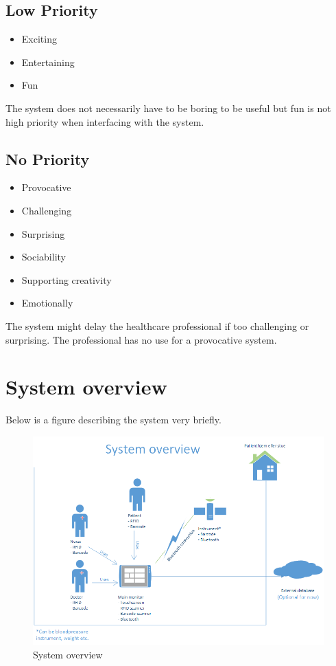 \subsection{Low Priority}
\begin{itemize}
\item Exciting
\item Entertaining
\item Fun
\end{itemize}
The system does not necessarily have to be boring to be useful but fun is not high priority when interfacing with the system.

\subsection{No Priority}
\begin{itemize}
\item Provocative
\item Challenging
\item Surprising
\item Sociability
\item Supporting creativity
\item Emotionally
\end{itemize}
The system might delay the healthcare professional if too challenging or surprising. The professional has no use for a provocative system. 

\section{System overview}
Below is a figure describing the system very briefly.
\begin{figure}[H]
\centering
\includegraphics[width=1\textwidth]{billeder/systemoversigt}
\caption{System overview}
\end{figure}












